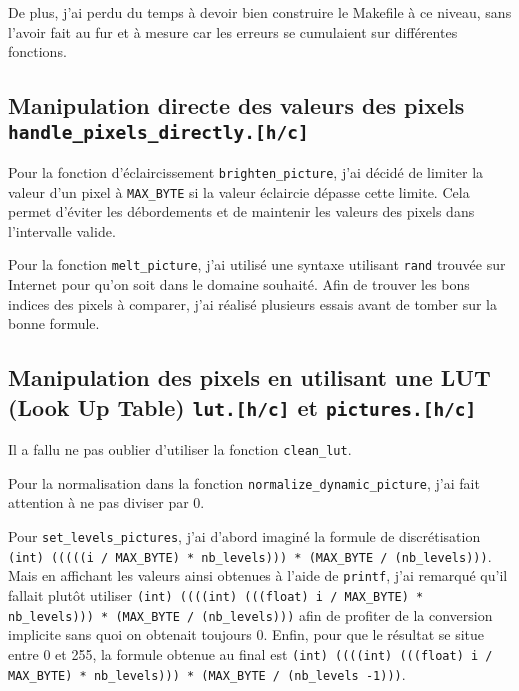 \documentclass[a4paper,12pt]{article}
\begin{document}
De plus, j'ai perdu du temps à devoir bien construire le Makefile à ce niveau, sans l'avoir fait au fur et à mesure car les erreurs se cumulaient sur différentes fonctions.

\subsection{Manipulation directe des valeurs des pixels \\ \texttt{handle\_pixels\_directly.[h/c]}}
Pour la fonction d'éclaircissement \texttt{brighten\_picture}, j'ai décidé de limiter la valeur d'un pixel à \texttt{MAX\_BYTE} si la valeur éclaircie dépasse cette limite. Cela permet d'éviter les débordements et de maintenir les valeurs des pixels dans l'intervalle valide.

Pour la fonction \texttt{melt\_picture}, j'ai utilisé une syntaxe utilisant \texttt{rand} trouvée sur Internet pour qu'on soit dans le domaine souhaité. Afin de trouver les bons indices des pixels à comparer, j'ai réalisé plusieurs essais avant de tomber sur la bonne formule.

\subsection{Manipulation des pixels en utilisant une LUT (Look Up Table) \texttt{lut.[h/c]} et \texttt{pictures.[h/c]}}
Il a fallu ne pas oublier d'utiliser la fonction \texttt{clean\_lut}.

Pour la normalisation dans la fonction \texttt{normalize\_dynamic\_picture}, j'ai fait attention à ne pas diviser par 0.

Pour \texttt{set\_levels\_pictures}, j'ai d'abord imaginé la formule de discrétisation \texttt{(int) (((((i / MAX\_BYTE) * nb\_levels))) * (MAX\_BYTE / (nb\_levels)))}. Mais en affichant les valeurs ainsi obtenues à l'aide de \texttt{printf}, j'ai remarqué qu'il fallait plutôt utiliser \texttt{(int) ((((int) (((float) i / MAX\_BYTE) * nb\_levels))) * (MAX\_BYTE / (nb\_levels)))} afin de profiter de la conversion implicite sans quoi on obtenait toujours 0. Enfin, pour que le résultat se situe entre 0 et 255, la formule obtenue au final est \texttt{(int) ((((int) (((float) i / MAX\_BYTE) * nb\_levels))) * (MAX\_BYTE / (nb\_levels -1)))}.
\end{document}
